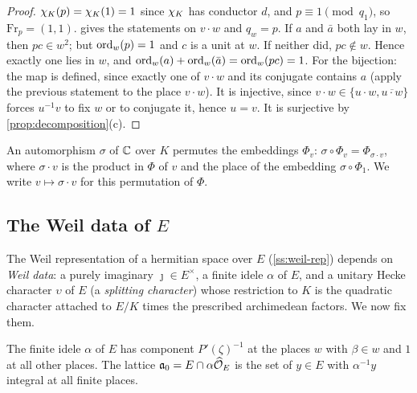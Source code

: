 \begin{proof}
$\chi_K(p)=\chi_K(1)=1$ since $\chi_K$ has conductor $d$, and $p\equiv1\pmod{q_1}$, so
$\mathrm{Fr}_p=(1,1)$.  gives the statements on $v\cdot w$ and $q_w=p$.
If $a$ and $\bar a$ both lay in $w$, then $pc\in w^2$; but $\operatorname{ord}_w(p)=1$ and $c$ is a unit at $w$.
If neither did, $pc\notin w$. Hence exactly one lies in $w$, and
$\operatorname{ord}_w(a)+\operatorname{ord}_w(\bar a)=\operatorname{ord}_w(pc)=1$. For the bijection: the map is defined, since exactly one of
$v\cdot w$ and its conjugate contains $a$ (apply the previous statement to the place $v\cdot w$).
It is injective, since $v\cdot w\in\{u\cdot w,\overline{u\cdot w}\}$ forces $u^{-1}v$ to fix $w$ or to
conjugate it, hence $u=v$. It is surjective by \cref{prop:decomposition}(c).
\end{proof}

An automorphism $\sigma$ of $\mathbb{C}$ over $K$ permutes the embeddings $\Phi_v$: $\sigma\circ\Phi_v=
\Phi_{\sigma\cdot v}$, where $\sigma\cdot v$ is the product in $\Phi$ of $v$ and the place of the
embedding $\sigma\circ\Phi_1$. We write $v\mapsto\sigma\cdot v$ for this permutation of $\Phi$.

\subsection{The Weil data of \texorpdfstring{$E$}{E}}\label{ss:weil-data-E}
The Weil representation of a hermitian space over $E$ (\cref{ss:weil-rep}) depends on \emph{Weil
data}: a purely imaginary $\jmath\in E^\times$, a finite idele $\alpha$ of $E$, and a unitary Hecke
character $\upsilon$ of $E$ (a \emph{splitting character}) whose restriction to $K$ is the quadratic
character attached to $E/K$ times the prescribed archimedean factors. We now fix them.

\begin{definition}\label{def:alpha}
The finite idele $\alpha$ of $E$ has component $P'(\zeta)^{-1}$ at the places $w$ with $\beta\in w$
and $1$ at all other places. The lattice $\mathfrak a_0=E\cap\alpha\widehat{\mathcal{O}}_E$ is the set of
$y\in E$ with $\alpha^{-1}y$ integral at all finite places.
\end{definition}

